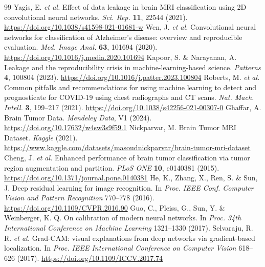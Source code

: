 ﻿\documentclass[twocolumn]{article}
\begin{document}
\begin{thebibliography}{99}
 Yagis, E. \textit{et al.} Effect of data leakage in brain MRI classification using 2D convolutional neural networks. \textit{Sci. Rep.} \textbf{11}, 22544 (2021). \url{https://doi.org/10.1038/s41598-021-01681-w}
 Wen, J. \textit{et al.} Convolutional neural networks for classification of Alzheimer's disease: overview and reproducible evaluation. \textit{Med. Image Anal.} \textbf{63}, 101694 (2020). \url{https://doi.org/10.1016/j.media.2020.101694}
 Kapoor, S. \& Narayanan, A. Leakage and the reproducibility crisis in machine-learning-based science. \textit{Patterns} \textbf{4}, 100804 (2023). \url{https://doi.org/10.1016/j.patter.2023.100804}
 Roberts, M. \textit{et al.} Common pitfalls and recommendations for using machine learning to detect and prognosticate for COVID-19 using chest radiographs and CT scans. \textit{Nat. Mach. Intell.} \textbf{3}, 199--217 (2021). \url{https://doi.org/10.1038/s42256-021-00307-0}
 Ghaffar, A. Brain Tumor Data. \textit{Mendeley Data}, V1 (2024). \url{https://doi.org/10.17632/w4sw3s9f59.1}
 Nickparvar, M. Brain Tumor MRI Dataset. \textit{Kaggle} (2021). \url{https://www.kaggle.com/datasets/masoudnickparvar/brain-tumor-mri-dataset}
 Cheng, J. \textit{et al.} Enhanced performance of brain tumor classification via tumor region augmentation and partition. \textit{PLoS ONE} \textbf{10}, e0140381 (2015). \url{https://doi.org/10.1371/journal.pone.0140381}
 He, K., Zhang, X., Ren, S. \& Sun, J. Deep residual learning for image recognition. In \textit{Proc. IEEE Conf. Computer Vision and Pattern Recognition} 770--778 (2016). \url{https://doi.org/10.1109/CVPR.2016.90}
 Guo, C., Pleiss, G., Sun, Y. \& Weinberger, K. Q. On calibration of modern neural networks. In \textit{Proc. 34th International Conference on Machine Learning} 1321--1330 (2017).
 Selvaraju, R. R. \textit{et al.} Grad-CAM: visual explanations from deep networks via gradient-based localization. In \textit{Proc. IEEE International Conference on Computer Vision} 618--626 (2017). \url{https://doi.org/10.1109/ICCV.2017.74}
\end{thebibliography}
\end{document}
